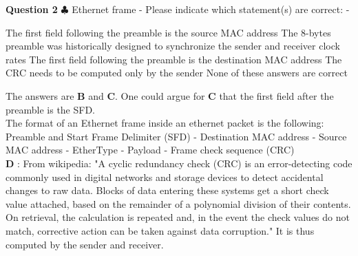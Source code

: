 \documentclass[en]{sourcefiles/eplexam}
\newcounter{choice}
\renewcommand\thechoice{\textbf{\Alph{choice}}}
\newcommand\choicelabel{\thechoice$\quad$}
\newenvironment{choices}%
  {\list{\choicelabel}%
     {\usecounter{choice}\def\makelabel##1{\hss\llap{##1}}%
       \settowidth{\leftmargin}{W.\hskip\labelsep\hskip 2.5em}%
       \def\choice{%
         \item
       } %
       \labelwidth\leftmargin\advance\labelwidth-\labelsep
       \topsep=0pt
       \partopsep=0pt
     }%
  }%
  {\endlist}
\begin{document}
\textbf{Question 2} $\clubsuit$ Ethernet frame - Please indicate which statement(s) are correct:
\begin{choices}
     \choice The first field following the preamble is the source MAC address
     \choice The 8-bytes preamble was historically designed to synchronize the sender and receiver clock rates
     \choice The first field following the preamble is the destination MAC address
     \choice The CRC needs to be computed only by the sender
     \choice None of these answers are correct
\end{choices}
\begin{solution}
The answers are \textbf{B} and \textbf{C}. One could argue for \textbf{C} that the first field after the preamble is the SFD.\\

\noindent The format of an Ethernet frame inside an ethernet packet is the following:\\
Preamble and Start Frame Delimiter (SFD) - Destination MAC address - Source MAC address - EtherType - Payload - Frame check sequence (CRC)\\

\noindent \textbf{D} : From wikipedia: "A cyclic redundancy check (CRC) is an error-detecting code commonly used in digital networks and storage devices to detect accidental changes to raw data. Blocks of data entering these systems get a short check value attached, based on the remainder of a polynomial division of their contents. On retrieval, the calculation is repeated and, in the event the check values do not match, corrective action can be taken against data corruption." It is thus computed by the sender and receiver.

\end{solution}
\end{document}
